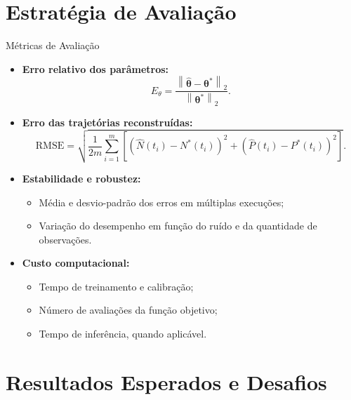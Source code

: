 \section{Estratégia de Avaliação}

\begin{frame}{Métricas de Avaliação}

\small

\begin{itemize}

    \item \textbf{Erro relativo dos parâmetros:}
    \[
    E_{\theta}
    =
    \frac{
        \left\|
        \hat{\boldsymbol{\theta}}
        -
        \boldsymbol{\theta}^{*}
        \right\|_2
    }{
        \left\|\boldsymbol{\theta}^{*}\right\|_2
    }.
    \]

    \item \textbf{Erro das trajetórias reconstruídas:}
    \[
    \mathrm{RMSE}
    =
    \sqrt{
        \frac{1}{2m}
        \sum_{i=1}^{m}
        \left[
        \left(\hat{N}(t_i)-N^{*}(t_i)\right)^2
        +
        \left(\hat{P}(t_i)-P^{*}(t_i)\right)^2
        \right]
    }.
    \]

    \item \textbf{Estabilidade e robustez:}
    \begin{itemize}
        \item Média e desvio-padrão dos erros
        em múltiplas execuções;
        \item Variação do desempenho em função
        do ruído e da quantidade de observações.
    \end{itemize}

    \item \textbf{Custo computacional:}
    \begin{itemize}
        \item Tempo de treinamento e calibração;
        \item Número de avaliações da função objetivo;
        \item Tempo de inferência, quando aplicável.
    \end{itemize}

\end{itemize}

\end{frame}

\section{Resultados Esperados e Desafios}

